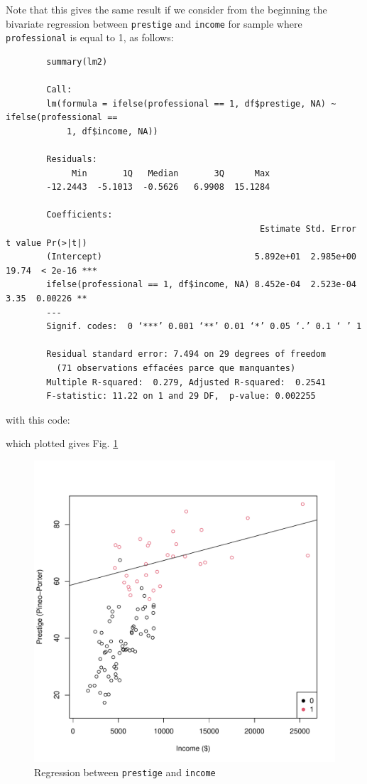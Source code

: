 \documentclass[12pt,letterpaper]{article}
\begin{document}
\begin{enumerate}
	
	Note that this gives the same result if we consider from the beginning the bivariate regression between \texttt{prestige} and \texttt{income} for sample where \texttt{professional} is equal to 1, as follows:
		
	\begin{verbatim}
		summary(lm2)

		Call:
		lm(formula = ifelse(professional == 1, df$prestige, NA) ~ ifelse(professional == 
		    1, df$income, NA))
		
		Residuals:
		     Min       1Q   Median       3Q      Max 
		-12.2443  -5.1013  -0.5626   6.9908  15.1284 
		
		Coefficients:
		                                          Estimate Std. Error t value Pr(>|t|)    
		(Intercept)                              5.892e+01  2.985e+00   19.74  < 2e-16 ***
		ifelse(professional == 1, df$income, NA) 8.452e-04  2.523e-04    3.35  0.00226 ** 
		---
		Signif. codes:  0 ‘***’ 0.001 ‘**’ 0.01 ‘*’ 0.05 ‘.’ 0.1 ‘ ’ 1
		
		Residual standard error: 7.494 on 29 degrees of freedom
		  (71 observations effacées parce que manquantes)
		Multiple R-squared:  0.279,	Adjusted R-squared:  0.2541 
		F-statistic: 11.22 on 1 and 29 DF,  p-value: 0.002255
	\end{verbatim}	

	with this code:
	  
	which plotted  gives Fig. \ref{fig:lm_2}
	\begin{figure}[h!]\centering
				\caption{\footnotesize Regression between \texttt{prestige} and  \texttt{income}}
				\label{fig:lm_2}
				\includegraphics[width=.85\textwidth]{lm2.pdf}
	\end{figure}	


\end{enumerate}
\end{document}
